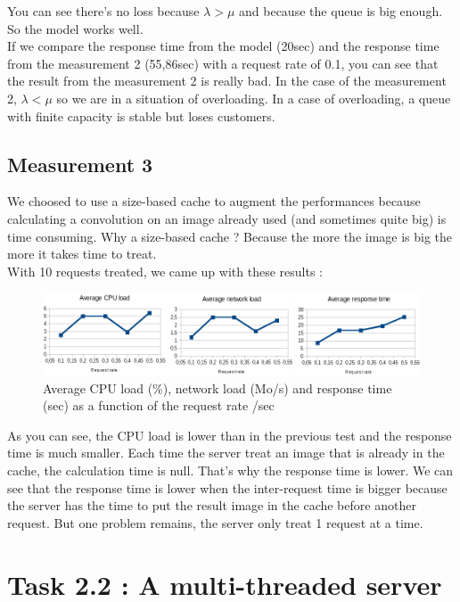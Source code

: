 \documentclass[11pt,a4paper]{article}
\begin{document}
You can see there's no loss because $ \lambda > \mu $ and because the queue is big enough. So the model works well.\\

If we compare the response time from the model (20sec) and the response time from the measurement 2 (55,86sec) with a request rate of 0.1, you can see that the result from the measurement 2 is really bad. In the case of the measurement 2, $ \lambda < \mu $ so we are in a situation of overloading. In a case of overloading, a queue with finite capacity is stable but loses customers.

\subsection{Measurement 3}

We choosed to use a size-based cache to augment the performances because calculating a convolution on an image already used (and sometimes quite big) is time consuming. Why a size-based cache ? Because the more the image is big the more it takes time to treat.\\

With 10 requests treated, we came up with these results :

\begin{figure}[h!]
\centering
\includegraphics[width=14cm]{measurement3.png}
\caption{Average CPU load (\%), network load (Mo/s) and response time (sec) as a function of the request rate /sec}
\end{figure}

As you can see, the CPU load is lower than in the previous test and the response time is much smaller. Each time the server treat  an image that is already in the cache, the calculation time is null. That's why the response time is lower. We can see that the response time is lower when the inter-request time is bigger because the server has the time to put the result image in the cache before another request. But one problem remains, the server only treat 1 request at a time.\\

\section{Task 2.2 : A multi-threaded server}
\end{document}
